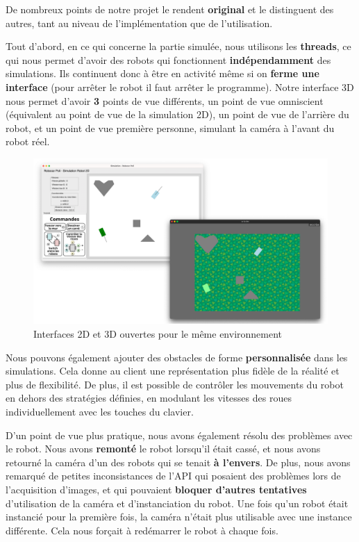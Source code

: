 \documentclass[12pt]{article}
\begin{document}
\hspace{\parindent}De nombreux points de notre projet le rendent \textbf{original} et le distinguent des autres, tant au niveau de l’implémentation que de l’utilisation. 

\hspace{\parindent}Tout d’abord, en ce qui concerne la partie simulée, nous utilisons les \textbf{threads}, ce qui nous permet d’avoir des robots qui fonctionnent \textbf{indépendamment} des simulations. Ils continuent donc à être en activité même si on \textbf{ferme une interface} (pour arrêter le robot il faut arrêter le programme). Notre interface 3D nous permet d’avoir \textbf{3} points de vue différents, un point de vue omniscient (équivalent au point de vue de la simulation 2D), un point de vue de l'arrière du robot, et un point de vue première personne, simulant la caméra à l'avant du robot réel. 

\begin{figure}[h]
    \centering
    \includegraphics[width=1\linewidth]{double.png}
    \caption{Interfaces 2D et 3D ouvertes pour le même environnement}
    \label{fig:enter-label}
\end{figure}

\hspace{\parindent}Nous pouvons également ajouter des obstacles de forme \textbf{personnalisée} dans les simulations. Cela donne au client une représentation plus fidèle de la réalité et plus de flexibilité. De plus, il est possible de contrôler les mouvements du robot en dehors des stratégies définies, en modulant les vitesses des roues individuellement avec les touches du clavier.

\hspace{\parindent}D’un point de vue plus pratique, nous avons également résolu des problèmes avec le robot. Nous avons \textbf{remonté} le robot lorsqu’il était cassé, et nous avons retourné la caméra d’un des robots qui se tenait \textbf{à l’envers}. De plus, nous avons remarqué de petites inconsistances de l’API qui posaient des problèmes lors de l’acquisition d’images, et qui pouvaient \textbf{bloquer d’autres tentatives} d’utilisation de la caméra et d’instanciation du robot. Une fois qu'un robot était instancié pour la première fois, la caméra n'était plus utilisable avec une instance différente. Cela nous forçait à redémarrer le robot à chaque fois.
\end{document}
